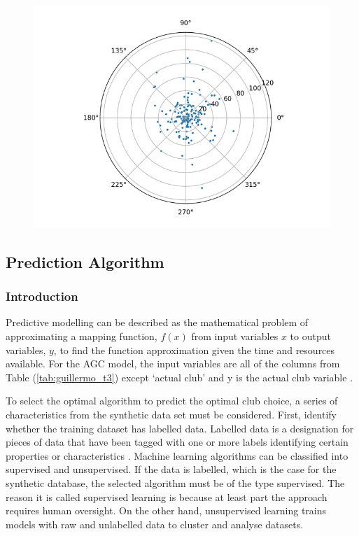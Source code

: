 \documentclass[11pt,landscape]{article}
\begin{document}
\begin{multicols}{3}
\begin{figure}[H]
    \begin{center}
        \includegraphics[]{compass.png}
    \end{center}
    \label{fig:compass}
\end{figure}

\subsection{Prediction Algorithm}
\subsubsection{Introduction}
Predictive modelling can be described as the mathematical problem of
approximating a mapping function, $f(x)$ from input variables $x$ to output
variables, $y$, to find the function approximation given the time and resources
available. For the AGC model, the input variables are all of the columns from
Table (\ref{tab:guillermo_t3}) except `actual club' and y is the actual club
variable \cite{classvsreg}.

To select the optimal algorithm to predict the optimal club choice, a series of
characteristics from the synthetic data set must be considered. First, identify
whether the training dataset has labelled data. Labelled data is a designation
for pieces of data that have been tagged with one or more labels identifying
certain properties or characteristics \cite{labeled_data}. Machine learning
algorithms can be classified into supervised and unsupervised. If the data is
labelled, which is the case for the synthetic database, the selected algorithm
must be of the type supervised. The reason it is called supervised learning is
because at least part the approach requires human oversight. On the other hand,
unsupervised learning trains models with raw and unlabelled data to cluster and
analyse datasets. 


\end{multicols}
\end{document}
